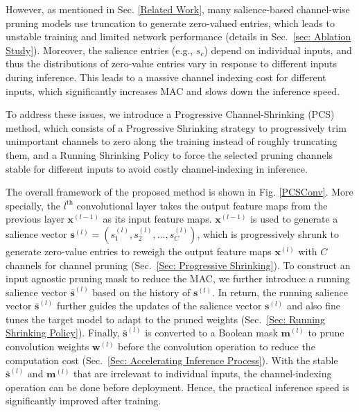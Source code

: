 \documentclass[lettersize,journal]{IEEEtran}
\begin{document}
However, as mentioned in Sec. \ref{Related Work}, many salience-based channel-wise pruning models use truncation to generate zero-valued entries, which leads to unstable training and limited network performance (details in Sec.~\ref{sec: Ablation Study}). Moreover, the salience entries (e.g., $s_{c}$) depend on individual inputs, and thus the distributions of zero-value entries vary in response to different inputs during inference.
This leads to a massive channel indexing cost for different inputs, which significantly increases MAC \cite{ma2018shufflenet} and slows down the inference speed.



To address these issues, we introduce a Progressive Channel-Shrinking (PCS) method, which consists of a Progressive Shrinking strategy to progressively trim unimportant channels to zero along the training instead of roughly truncating them, and a Running Shrinking Policy to force the selected pruning channels stable for different inputs to avoid costly channel-indexing in inference.




The overall framework of the proposed method is shown in Fig. \ref{PCSConv}. More specially, the $l^{\text{th}}$ convolutional layer takes the output feature maps from the previous layer $\boldsymbol{x}^{(l-1)}$ as its input feature maps. 
$\boldsymbol{x}^{(l-1)}$ is used  to generate a salience vector $\boldsymbol{s}^{(l)}=(s^{(l)}_{1},s^{(l)}_{2},...,s^{(l)}_{C})$, which is progressively shrunk to generate zero-value entries  to reweigh the output feature maps $\boldsymbol{x}^{(l)}$ with $C$ channels for channel pruning (Sec.~\ref{Sec: Progressive Shrinking}). To construct an input agnostic pruning mask to reduce the MAC, we further introduce a running salience vector $\overline{\boldsymbol{s}}^{(l)}$ based on the history of $\boldsymbol{s}^{(l)}$. In return, the running salience vector $\overline{\boldsymbol{s}}^{(l)}$ further guides the updates of the salience vector $\boldsymbol{s}^{(l)}$ and also fine tunes the target model to adapt to the pruned weights (Sec.~\ref{Sec: Running Shrinking Policy}).   
Finally, $\overline{\boldsymbol{s}}^{(l)}$ is converted to a Boolean mask $\boldsymbol{m}^{(l)}$ to prune convolution weights $\boldsymbol{w}^{(l)}$ before the convolution operation to reduce the computation cost (Sec.~\ref{Sec: Accelerating Inference Process}). With the stable $\overline{\boldsymbol{s}}^{(l)}$ and $\boldsymbol{m}^{(l)}$ that are irrelevant to individual inputs, the channel-indexing operation can be done before deployment. Hence, the practical inference speed is significantly improved after training. 
\end{document}
